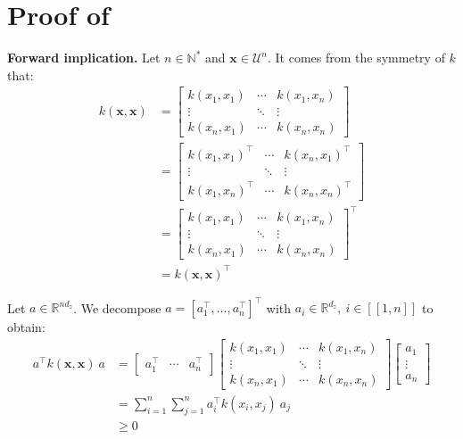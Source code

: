 \section[Proof of Proposition 3.2]{Proof of }\label{sec:proof_definite_kernels}

\textbf{Forward implication.} Let $n\in\mathbb{N}^*$ and $\mathbf{x}\in\mathcal{U}^n$. It comes from the symmetry of $k$ that:
\begin{equation}
	\begin{aligned}
	k(\mathbf{x},\mathbf{x})&=\begin{bmatrix}
	k(x_1,x_1)&\cdots&k(x_1,x_n)\\\vdots&\ddots&\vdots\\k(x_n,x_1)&\cdots&k(x_n,x_n)
	\end{bmatrix}\\
	&=\begin{bmatrix}
	k(x_1,x_1)^\top&\cdots&k(x_n,x_1)^\top\\\vdots&\ddots&\vdots\\k(x_1,x_n)^\top&\cdots&k(x_n,x_n)^\top
	\end{bmatrix}\\
	&=\begin{bmatrix}
	k(x_1,x_1)&\cdots&k(x_1,x_n)\\\vdots&\ddots&\vdots\\k(x_n,x_1)&\cdots&k(x_n,x_n)
	\end{bmatrix}^\top\\
	&=k(\mathbf{x},\mathbf{x})^\top
	\end{aligned}
\end{equation}

Let $a\in\mathbb{R}^{nd_z}$. We decompose $a=[a_1^\top,\dots,a_n^\top]^\top$ with $a_i\in\mathbb{R}^{d_z},\:i\in[\![1,n]\!]$ to obtain:
\begin{equation}
	\begin{aligned}
	a^\top k(\mathbf{x},\mathbf{x})\:a&=\begin{bmatrix}a_1^\top&\cdots&a_n^\top\end{bmatrix}\begin{bmatrix}k(x_1,x_1)&\cdots&k(x_1,x_n)\\\vdots&\ddots&\vdots\\k(x_n,x_1)&\cdots&k(x_n,x_n)\end{bmatrix}\begin{bmatrix}a_1\\\vdots\\a_n\end{bmatrix}\\
	&=\sum_{i=1}^n\sum_{j=1}^na_i^\top k(x_i,x_j)\:a_j\\
	&\geq0
	\end{aligned}
\end{equation}

